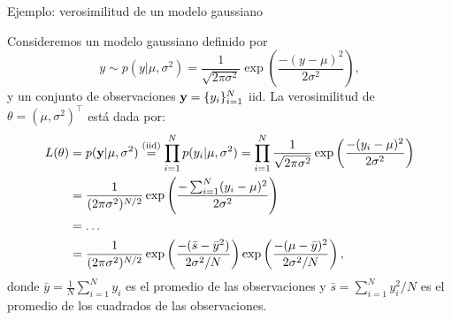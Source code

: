 \documentclass[handout, 9pt]{beamer}
\begin{document}
\begin{frame}{Ejemplo: verosimilitud de un modelo gaussiano}

Consideremos un  modelo gaussiano definido por 
\begin{equation*}
	y \sim p(y|\mu,\sigma^2) = \frac{1}{\sqrt{2\pi\sigma^2}}\exp\left(\frac{-(y-\mu)^2}{2\sigma^2}\right), \label{eq:ejemplo_gaussiano}
\end{equation*}
y un conjunto de observaciones $\mathbf{y} = \{y_i\}_{i=1}^N$ iid. \pause La verosimilitud  de $\theta  =  (\mu,\sigma^2)^\top$ está dada por:
\begin{align}
  	L(\theta)  &=  p(\mathbf{y}|\mu,\sigma^2) \stackrel{\text{(iid)}}{=}\prod_{i=1}^N p(y_i|\mu,\sigma^2) = \prod_{i=1}^N \frac{1}{\sqrt{2\pi\sigma^2}}\exp\left(\frac{-(y_i-\mu)^2}{2\sigma^2}\right)\nonumber\\ 
  				 &= \frac{1}{(2\pi\sigma^2)^{N/2}}  \exp\left(\frac{-\sum_{i=1}^N(y_i-\mu)^2}{2\sigma^2}\right)\nonumber\\
  				 &= \ldots\nonumber\\
  				 & = \frac{1}{(2\pi\sigma^2)^{N/2}}  \exp\left(\frac{-(\bar s  - \bar y^2)}{2\sigma^2/N}\right)\exp\left(\frac{-(\mu - \bar y)^2}{2\sigma^2/N}\right)
  				\nonumber,
 \end{align}  
 donde $\bar y = \tfrac{1}{N}\sum_{i=1}^Ny_i$ es el promedio de las observaciones y $\bar s = \sum_ {i=1}^Ny_i^2/N$ es el promedio de los cuadrados de las observaciones.
	
\end{frame}
\end{document}
